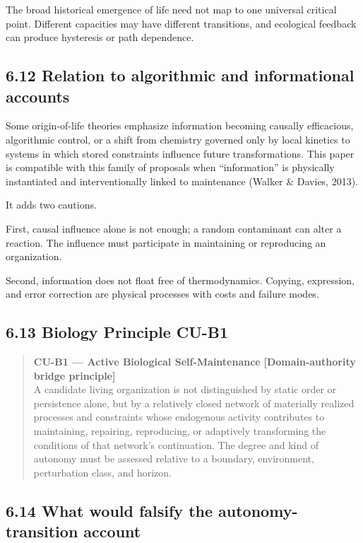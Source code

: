 \documentclass[
  11pt,
]{article}
\begin{document}
The broad historical emergence of life need not map to one universal
critical point. Different capacities may have different transitions, and
ecological feedback can produce hysteresis or path dependence.

\subsection{6.12 Relation to algorithmic and informational
accounts}\label{relation-to-algorithmic-and-informational-accounts}

Some origin-of-life theories emphasize information becoming causally
efficacious, algorithmic control, or a shift from chemistry governed
only by local kinetics to systems in which stored constraints influence
future transformations. This paper is compatible with this family of
proposals when ``information'' is physically instantiated and
interventionally linked to maintenance (Walker \& Davies, 2013).

It adds two cautions.

First, causal influence alone is not enough; a random contaminant can
alter a reaction. The influence must participate in maintaining or
reproducing an organization.

Second, information does not float free of thermodynamics. Copying,
expression, and error correction are physical processes with costs and
failure modes.

\subsection{6.13 Biology Principle CU-B1}\label{biology-principle-cu-b1}

\begin{quote}
\textbf{CU-B1 --- Active Biological Self-Maintenance}
\textbf{{[}Domain-authority bridge principle{]}}\\
A candidate living organization is not distinguished by static order or
persistence alone, but by a relatively closed network of materially
realized processes and constraints whose endogenous activity contributes
to maintaining, repairing, reproducing, or adaptively transforming the
conditions of that network's continuation. The degree and kind of
autonomy must be assessed relative to a boundary, environment,
perturbation class, and horizon.
\end{quote}

\subsection{6.14 What would falsify the autonomy-transition
account}\label{what-would-falsify-the-autonomy-transition-account}
\end{document}
